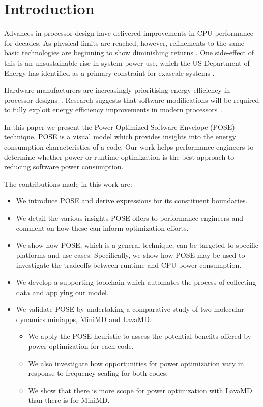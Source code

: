 \section{Introduction}
Advances in processor design have delivered improvements in CPU performance for decades. As physical limits are reached, however, refinements to the same basic technologies are beginning to show diminishing returns \cite{esmaeilzadeh:2011aa}. One side-effect of this is an unsustainable rise in system power use, which the US Department of Energy has identified as a primary constraint for exascale systems \cite{shalf:2011aa}.

Hardware manufacturers are increasingly prioritising energy efficiency in processor designs~\cite{kurd:2014aa}. 
Research suggests that software modifications will be required to fully exploit energy efficiency improvements in modern processors~\cite{shao:2013aa}. 

In this paper we present the Power Optimized Software Envelope (POSE) technique.
POSE is a visual model which provides insights into the energy consumption characteristics of a code.
Our work helps performance engineers to determine whether power or runtime optimization is the best approach to reducing software power consumption.

\medskip \noindent
The contributions made in this work are:
\begin{itemize}
  \item We introduce POSE and derive expressions for its constituent boundaries.
  \item We detail the various insights POSE offers to performance engineers and comment on how these can inform optimization efforts.
  \item We show how POSE, which is a general technique, can be targeted to specific platforms and use-cases. 
  Specifically, we show how POSE may be used to investigate the tradeoffs between runtime and CPU power consumption.
  \item We develop a supporting toolchain which automates the process of collecting data and applying our model. 
  \item We validate POSE by undertaking a comparative study of two molecular dynamics miniapps, MiniMD and LavaMD.
  \begin{itemize}
    \item We apply the POSE heuristic to assess the potential benefits offered by power optimization for each code.
    \item We also investigate how opportunities for power optimization vary in response to frequency scaling for both codes.
    \item We show that there is more scope for power optimization with LavaMD than there is for MiniMD.
  \end{itemize}
\end{itemize}

